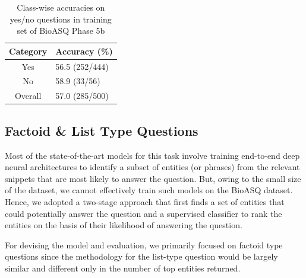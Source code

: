 \documentclass[11pt,a4paper]{article}
\begin{document}
\begin{table}[t!]
    \centering
    \begin{tabular}{c|l} \hline
    
    Category & Accuracy (\%) \\ \hline
    Yes      &  56.5  (252/444)\\
    No       &  58.9 (33/56) \\
    Overall  &  57.0 (285/500) \\      \hline
    \end{tabular}
    \caption{Class-wise accuracies on yes/no questions in training set of BioASQ Phase 5b}
    \label{tab:yesno_results}
\end{table}

\subsection{Factoid \& List Type Questions}

Most of the state-of-the-art models for this task involve training end-to-end deep neural architectures to identify a subset of entities (or phrases) from the relevant snippets that are most likely to answer the question. But, owing to the small size of the dataset, we cannot effectively train such models on the BioASQ dataset. Hence, we adopted a two-stage approach that first finds a set  of entities that could potentially answer the question and a supervised classifier to rank the entities on the basis of their likelihood of answering the question.

For devising the model and evaluation, we primarily focused on factoid type questions since the methodology for the list-type question would be largely similar and different only in the number of top entities returned. 
\end{document}
